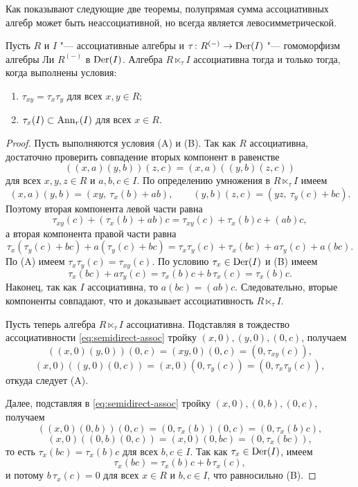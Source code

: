 \documentclass[a4paper,14pt,oneside,openany]{memoir}
\begin{document}
Как показывают следующие две теоремы, полупрямая сумма ассоциативных алгебр
может быть неассоциативной, но всегда является левосимметрической.
\begin{theorem}\label{th:semidirect-assoc-cond}
    Пусть $R$ и $I$ "--- ассоциативные алгебры и $\tau\colon R^{(-)}\to\operatorname{Der}(I)$
    "--- гомоморфизм алгебры Ли $R^{(-)}$ в $\operatorname{Der}(I)$. Алгебра $R\ltimes_{\tau} I$
    ассоциативна тогда и только тогда, когда выполнены условия:
    \begin{enumerate}
        \item[\textup{(A)}] $\tau_{xy}=\tau_x\tau_y$ для всех $x,y\in R$;
        \item[\textup{(B)}] $\tau_x(I)\subset \operatorname{Ann}_r(I)$ для всех $x\in R$.
    \end{enumerate}
\end{theorem}
\begin{proof}
    Пусть выполняются условия (A) и (B). Так как $R$ ассоциативна, достаточно
    проверить совпадение вторых компонент в равенстве
    \begin{equation}\label{eq:semidirect-assoc}
        ((x,a)(y,b))(z,c)=(x,a)((y,b)(z,c))
    \end{equation}
    для всех $x,y,z \in R$ и $a,b,c \in I$. По определению умножения в
    $R\ltimes_{\tau} I$ имеем
    \[
        (x,a)(y,b)=(xy,\ \tau_x(b)+ab),\qquad (y,b)(z,c)=(yz,\ \tau_y(c)+bc).
    \]
    Поэтому вторая компонента левой части равна
    \[
        \tau_{xy}(c)+(\tau_x(b)+ab)c=\tau_{xy}(c)+\tau_x(b)c+(ab)c,
    \]
    а вторая компонента правой части равна
    \[
        \tau_x(\tau_y(c)+bc)+a(\tau_y(c)+bc)=\tau_x\tau_y(c)+\tau_x(bc)+a\tau_y(c)+a(bc).
    \]
    По \textup{(A)} имеем $\tau_x\tau_y(c) = \tau_{xy}(c)$. По условию
    $\tau_x\in\operatorname{Der}(I)$ и \textup{(B)} имеем
    \[
        \tau_x(bc) + a\tau_y(c) = \tau_x(b)c+b\,\tau_x(c) = \tau_x(b)c.
    \]
    Наконец, так как $I$ ассоциативна, то $a(bc)=(ab)c$. Следовательно, вторые
    компоненты совпадают, что и доказывает ассоциативность $R\ltimes_{\tau} I$.

    \medskip

    Пусть теперь алгебра $R\ltimes_{\tau} I$ ассоциативна. Подставляя в тождество
    ассоциативности \eqref{eq:semidirect-assoc} тройку $(x,0),(y,0),(0,c)$,
    получаем
    \[
        ((x,0)(y,0))(0,c)=(xy,0)(0,c)=(0,\tau_{xy}(c)),
    \]
    \[
        (x,0)((y,0)(0,c))=(x,0)(0,\tau_y(c))=(0,\tau_x\tau_y(c)),
    \]
    откуда следует (A).

    \medskip

    Далее, подставляя в \eqref{eq:semidirect-assoc} тройку $(x,0),(0,b),(0,c)$,
    получаем
    \[
        ((x,0)(0,b))(0,c)=(0,\tau_x(b))(0,c)=(0,\tau_x(b)c),
    \]
    \[
        (x,0)((0,b)(0,c))=(x,0)(0,bc)=(0,\tau_x(bc)),
    \]
    то есть $\tau_x(bc)=\tau_x(b)c$ для всех $b,c\in I$. Так как
    $\tau_x\in\operatorname{Der}(I)$, имеем
    \[
        \tau_x(bc)=\tau_x(b)c+b\,\tau_x(c),
    \]
    и потому $b\,\tau_x(c)=0$ для всех $x \in R$ и $b,c\in I$, что равносильно (B).
\end{proof}
\end{document}

